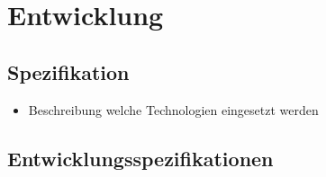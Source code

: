 \documentclass[Bachelorarbeit.tex]{subfiles}
\begin{document}
\chapter{Entwicklung}
\label{chap:entwicklung}








\section{Spezifikation}

\begin{itemize} \color{red}
\item Beschreibung welche Technologien eingesetzt werden

\end{itemize}





\section{Entwicklungsspezifikationen}
\label{sec:usecases}
\end{document}
